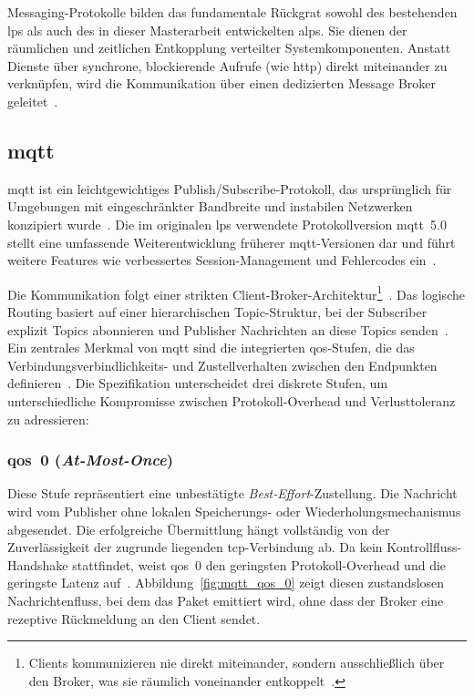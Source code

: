 Messaging-Protokolle bilden das fundamentale Rückgrat sowohl des bestehenden \gls{lps} als auch des in dieser Masterarbeit entwickelten \gls{alps}. Sie dienen der räumlichen und zeitlichen Entkopplung verteilter Systemkomponenten. Anstatt Dienste über synchrone, blockierende Aufrufe (wie \gls{http}) direkt miteinander zu verknüpfen, wird die Kommunikation über einen dedizierten Message Broker geleitet~\citep{hohpe2004enterprise}.


\subsection{\acrfull{mqtt}}
\label{subsec:grundlagen_mqtt}

\gls{mqtt} ist ein leichtgewichtiges Publish/Subscribe-Protokoll, das ursprünglich für Umgebungen mit eingeschränkter Bandbreite und instabilen Netzwerken konzipiert wurde~\citep{thangavel2014performance}. %
Die im originalen \gls{lps} verwendete Protokollversion \gls{mqtt}~5.0 stellt eine umfassende Weiterentwicklung früherer \gls{mqtt}-Versionen dar und führt weitere Features wie verbessertes Session-Management und Fehlercodes ein~\citep{oasis2019mqtt, hivemq_mqtt5_essentials}.

Die Kommunikation folgt einer strikten Client-Broker-Architektur\footnote{Clients kommunizieren nie direkt miteinander, sondern ausschließlich über den Broker, was sie räumlich voneinander entkoppelt~\citep{eugster2003many}.}~\citep{oasis2019mqtt}. Das logische Routing basiert auf einer hierarchischen Topic-Struktur, bei der Subscriber explizit Topics abonnieren und Publisher Nachrichten an diese Topics senden~\citep{oasis2019mqtt, eugster2003many}. Ein zentrales Merkmal von \gls{mqtt} sind die integrierten \gls{qos}-Stufen, die das Verbindungsverbindlichkeits- und Zustellverhalten zwischen den Endpunkten definieren~\citep{oasis2019mqtt}. Die Spezifikation unterscheidet drei diskrete Stufen, um unterschiedliche Kompromisse zwischen Protokoll-Overhead und Verlusttoleranz zu adressieren:

\subsubsection{\gls{qos}~0 (\textit{At-Most-Once})}
Diese Stufe repräsentiert eine unbestätigte \textit{Best-Effort}-Zustellung. Die Nachricht wird vom Publisher ohne lokalen Speicherungs- oder Wiederholungsmechanismus abgesendet. Die erfolgreiche Übermittlung hängt vollständig von der Zuverlässigkeit der zugrunde liegenden \gls{tcp}-Verbindung ab. Da kein Kontrollfluss-Handshake stattfindet, weist \gls{qos}~0 den geringsten Protokoll-Overhead und die geringste Latenz auf~\citep{oasis2019mqtt, hivemq_mqtt5_essentials}.
Abbildung~\ref{fig:mqtt_qos_0} zeigt diesen zustandslosen Nachrichtenfluss, bei dem das Paket emittiert wird, ohne dass der Broker eine rezeptive Rückmeldung an den Client sendet.

